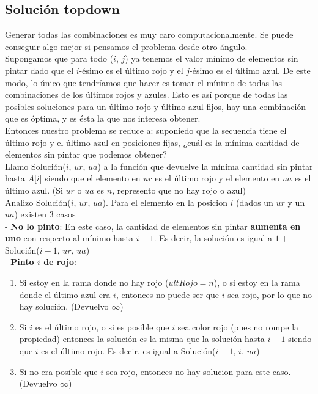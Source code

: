 \subsection{Solución topdown}

Generar todas las combinaciones es muy caro computacionalmente. Se puede conseguir algo mejor si pensamos el problema desde otro ángulo. \\

Supongamos que para todo ($i$, $j$) ya tenemos el valor mínimo de elementos sin pintar dado que el $i$-ésimo es el último rojo y el $j$-ésimo es el último azul. De este modo, lo único que tendríamos que hacer es tomar el mínimo de todas las combinaciones de los últimos rojos y azules. Esto es así porque de todas las posibles soluciones para un último rojo y último azul fijos, hay una combinación que es óptima, y es ésta la que nos interesa obtener. \\

Entonces nuestro problema se reduce a: suponiedo que la secuencia tiene el último rojo y el último azul en posiciones fijas, ¿cuál es la mínima cantidad de elementos sin pintar que podemos obtener? \\

Llamo Solución($i$, $ur$, $ua$) a la función que devuelve la mínima cantidad sin pintar hasta $A$[$i$] siendo que el elemento en $ur$ es el último rojo y el elemento en $ua$ es el último azul. (Si $ur$ o $ua$ es $n$, represento que no hay rojo o azul) \\


Analizo Solución($i$, $ur$, $ua$). Para el elemento en la posicion $i$ (dados un $ur$ y un $ua$) existen 3 casos \\

- \textbf{No lo pinto}: En este caso, la cantidad de elementos sin pintar \textbf{aumenta en uno} con respecto al mínimo hasta $i-1$. Es decir, la solución es igual a $1 + $Solución($i-1$, $ur$, $ua$) \\

- \textbf{Pinto $i$ de rojo}: 
\begin{enumerate}
\item Si estoy en la rama donde no hay rojo ($ultRojo = n$), o si estoy en la rama donde el último azul era $i$, entonces no puede ser que $i$ sea rojo, por lo que no hay solución. (Devuelvo $\infty$)
\item Si $i$ es el último rojo, o si es posible que $i$ sea color rojo (pues no rompe la propiedad) entonces la solución es la misma que la solución hasta $i-1$ siendo que $i$ es el último rojo. Es decir, es igual a Solución($i-1$, $i$, $ua$)
\item Si no era posible que $i$ sea rojo, entonces no hay solucion para este caso. (Devuelvo $\infty$)
\end{enumerate} 

